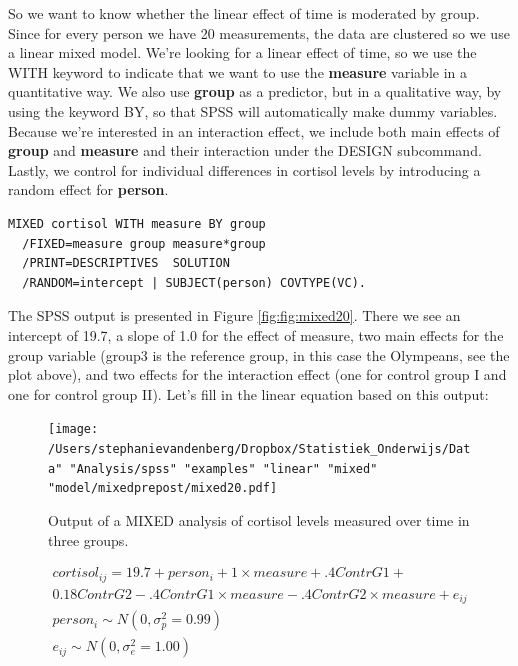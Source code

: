 \documentclass[]{report}\usepackage[]{graphicx}\usepackage[]{color}
\begin{document}
So we want to know whether the linear effect of time is moderated by group. Since for every person we have 20 measurements, the data are clustered so we use a linear mixed model. We're looking for a linear effect of time, so we use the WITH keyword to indicate that we want to use the \textbf{measure} variable in a quantitative way. We also use \textbf{group} as a predictor, but in a qualitative way, by using the keyword BY, so that SPSS will automatically make dummy variables. Because we're interested in an interaction effect, we include both main effects of \textbf{group} and \textbf{measure} and their interaction under the DESIGN subcommand. Lastly, we control for individual differences in cortisol levels by introducing a random effect for \textbf{person}.


\begin{verbatim}
MIXED cortisol WITH measure BY group 
  /FIXED=measure group measure*group
  /PRINT=DESCRIPTIVES  SOLUTION
  /RANDOM=intercept | SUBJECT(person) COVTYPE(VC).
\end{verbatim}


The SPSS output is presented in Figure \ref{fig:fig:mixed20}. There we see an intercept of 19.7, a slope of 1.0 for the effect of measure, two main effects for the group variable (group3 is the reference group, in this case the Olympeans, see the plot above), and two effects for the interaction effect (one for control group I and one for control group II). Let's fill in the linear equation based on this output:



\begin{figure}[h]
    \begin{center}
       \texttt{[image: /Users/stephanievandenberg/Dropbox/Statistiek\_Onderwijs/Data" "Analysis/spss" "examples" "linear" "mixed" "model/mixedprepost/mixed20.pdf]}
    \end{center}
    \label{fig:mixed20}
    \caption{Output of a MIXED analysis of cortisol levels measured over time in three groups.}
\end{figure}



\begin{eqnarray}
cortisol_{ij} = 19.7 + person_i + 1 \times measure + .4  ContrG1 + \nonumber\\
      0.18 ContrG2 -.4  ContrG1 \times measure -.4  ContrG2 \times measure+   e_{ij} \nonumber\\
person_i \sim N(0, \sigma_p^2 = 0.99)\nonumber\\
e_{ij} \sim N(0, \sigma_e^2 = 1.00) \nonumber
\end{eqnarray}
\end{document}
